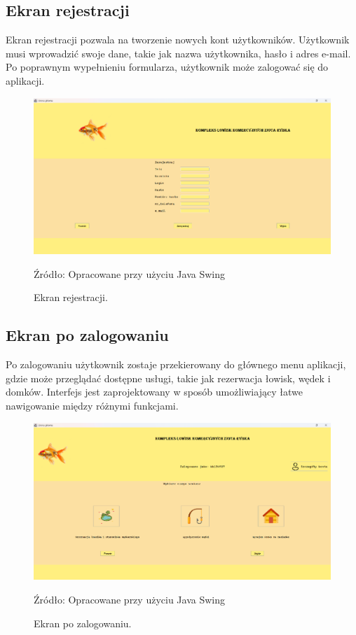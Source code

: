 \subsection{Ekran rejestracji}
Ekran rejestracji pozwala na tworzenie nowych kont użytkowników. Użytkownik musi wprowadzić swoje dane, takie jak nazwa użytkownika, hasło i adres e-mail. Po poprawnym wypełnieniu formularza, użytkownik może zalogować się do aplikacji.
\begin{figure}[H]
    \centering
    \includegraphics[width=0.8\linewidth]{figures/register.eps}
    \caption{Ekran rejestracji.}
    \label{fig:register_screen}
    \small{Źródło: Opracowane przy użyciu Java Swing}
\end{figure}


\subsection{Ekran po zalogowaniu}
Po zalogowaniu użytkownik zostaje przekierowany do głównego menu aplikacji, gdzie może przeglądać dostępne usługi, takie jak rezerwacja łowisk, wędek i domków. Interfejs jest zaprojektowany w sposób umożliwiający łatwe nawigowanie między różnymi funkcjami.
\begin{figure}[H]
    \centering
    \includegraphics[width=0.8\linewidth]{figures/after.eps}
    \caption{Ekran po zalogowaniu.}
    \label{fig:after_login_screen}
    \small{Źródło: Opracowane przy użyciu Java Swing}\
\end{figure}


